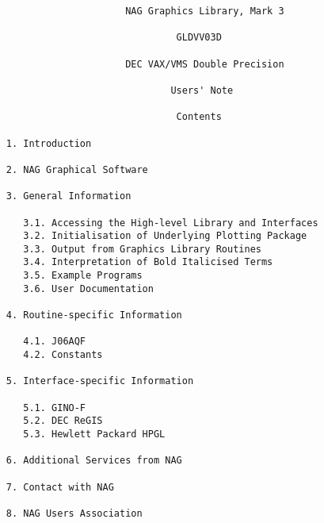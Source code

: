 \begin{verbatim}
                          NAG Graphics Library, Mark 3

                                   GLDVV03D

                          DEC VAX/VMS Double Precision

                                  Users' Note

                                   Contents

     1. Introduction

     2. NAG Graphical Software

     3. General Information

        3.1. Accessing the High-level Library and Interfaces
        3.2. Initialisation of Underlying Plotting Package
        3.3. Output from Graphics Library Routines
        3.4. Interpretation of Bold Italicised Terms
        3.5. Example Programs
        3.6. User Documentation

     4. Routine-specific Information

        4.1. J06AQF
        4.2. Constants

     5. Interface-specific Information

        5.1. GINO-F
        5.2. DEC ReGIS
        5.3. Hewlett Packard HPGL

     6. Additional Services from NAG

     7. Contact with NAG

     8. NAG Users Association
\end{verbatim}
\newpage
